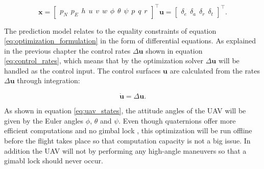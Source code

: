 \begin{subequations}
\begin{equation}
	\label{eq:uav_states}
	\mathbf{x} =
	\begin{bmatrix}
		p_N \hspace{5pt} p_E \hspace{5pt} h \hspace{5pt}
		u \hspace{5pt} v \hspace{5pt} w \hspace{5pt}
		\phi \hspace{5pt} \theta \hspace{5pt} \psi \hspace{5pt}
		p \hspace{5pt} q \hspace{5pt} r
	\end{bmatrix}^\intercal
\end{equation}
\begin{equation}
	\mathbf{u} =
	\begin{bmatrix}
		\delta_e \hspace{5pt} \delta_a \hspace{5pt} \delta_r \hspace{5pt} \delta_t
	\end{bmatrix}^\intercal.
\end{equation}
\end{subequations}

The prediction model relates to the equality constraints of equation \ref{eq:optimization_formulation} in the form of differential equations. As explained in the previous chapter the control rates $\Delta\mathbf{u}$ shown in equation \ref{eq:control_rates}, which means that by the optimization solver $\Delta\mathbf{u}$ will be handled as the control input. The control surfaces $\mathbf{u}$ are calculated from the rates $\Delta\mathbf{u}$ through integration:

\begin{equation}
	\mathbf{\dot{u}} = \Delta\mathbf{u}.
\end{equation}

As shown in equation \ref{eq:uav_states}, the attitude angles of the UAV will be given by the Euler angles $\phi$, $\theta$ and $\psi$. Even though quaternions offer more efficient computations and no gimbal lock \cite{uavBEARD}, this optimization will be run offline before the flight takes place so that computation capacity is not a big issue. In addition the UAV will not by performing any high-angle maneuvers so that a gimabl lock should never occur.


